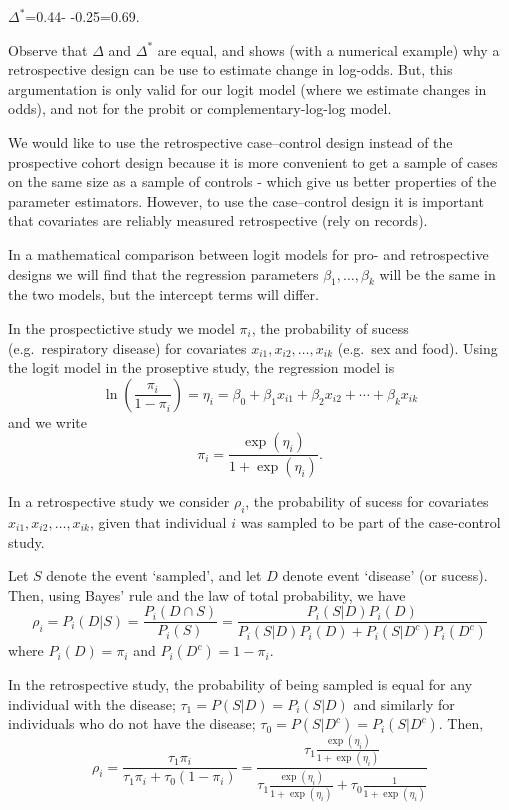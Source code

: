 \documentclass[
]{article}
\begin{document}
\(\Delta^*\)=0.44- -0.25=0.69.

Observe that \(\Delta\) and \(\Delta^*\) are equal, and shows (with a
numerical example) why a retrospective design can be use to estimate
change in log-odds. But, this argumentation is only valid for our logit
model (where we estimate changes in odds), and not for the probit or
complementary-log-log model.

We would like to use the retrospective case--control design instead of
the prospective cohort design because it is more convenient to get a
sample of cases on the same size as a sample of controls - which give us
better properties of the parameter estimators. However, to use the
case--control design it is important that covariates are reliably
measured retrospective (rely on records).

In a mathematical comparison between logit models for pro- and
retrospective designs we will find that the regression parameters
\(\beta_1, \ldots, \beta_k\) will be the same in the two models, but the
intercept terms will differ.

In the prospectictive study we model \(\pi_i\), the probability of
sucess (e.g.~respiratory disease) for covariates
\(x_{i1}, x_{i2}, \ldots, x_{ik}\) (e.g.~sex and food). Using the logit
model in the proseptive study, the regression model is
\[ \ln (\frac{\pi_i}{1-\pi_i}) = \eta_i =  \beta_0+\beta_1 x_{i1}+\beta_2 x_{i2}+\cdots + \beta_k x_{ik} \]
and we write \[ \pi_i=\frac{\exp(\eta_i)}{1+\exp(\eta_i)}.\]

In a retrospective study we consider \(\rho_i\), the probability of
sucess for covariates \(x_{i1}, x_{i2}, \ldots, x_{ik}\), given that
individual \(i\) was sampled to be part of the case-control study.

Let \(S\) denote the event `sampled', and let \(D\) denote event
`disease' (or sucess). Then, using Bayes' rule and the law of total
probability, we have
\[ \rho_i= P_i(D|S) = \frac{P_i(D \cap S)}{P_i(S)} = \frac{P_i(S|D)P_i(D)}{P_i(S|D)P_i(D) + P_i(S|D^c)P_i(D^c)}  \]
where \(P_i(D) = \pi_i\) and \(P_i(D^c) = 1-\pi_i\).

In the retrospective study, the probability of being sampled is equal
for any individual with the disease; \(\tau_1 = P(S|D) = P_i(S|D)\) and
similarly for individuals who do not have the disease;
\(\tau_0 = P(S|D^c) = P_i(S|D^c)\). Then,
\[ \rho_i= \frac{\tau_1 \pi_i}{\tau_1 \pi_i + \tau_0 (1-\pi_i)}  =  \frac{\tau_1 \frac{\exp(\eta_i)}{1+\exp(\eta_i)}}{\tau_1 \frac{\exp(\eta_i)}{1+\exp(\eta_i)} + \tau_0 \frac{1}{1+\exp(\eta_i)}}\]
\end{document}

